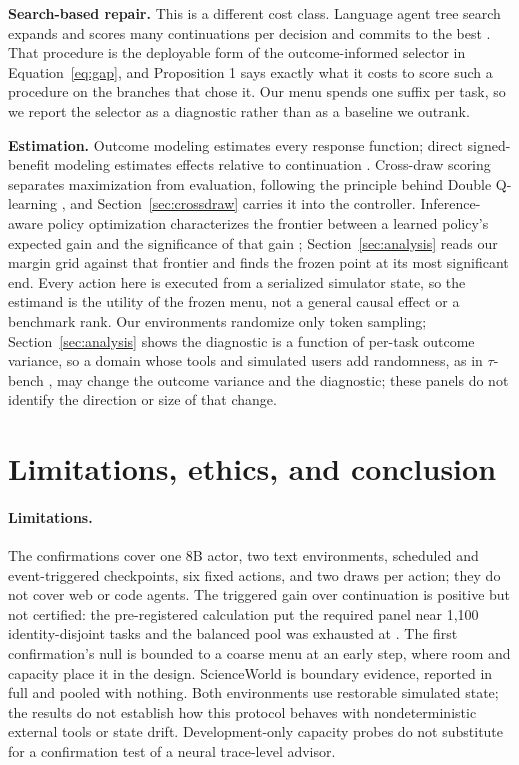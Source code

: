 \documentclass{article}
\begin{document}
\textbf{Search-based repair.} This is a different cost class. Language agent tree search expands and scores many continuations per decision and commits to the best \citep{zhou2024lats}. That procedure is the deployable form of the outcome-informed selector in Equation~\ref{eq:gap}, and Proposition 1 says exactly what it costs to score such a procedure on the branches that chose it. Our menu spends one suffix per task, so we report the selector as a diagnostic rather than as a baseline we outrank.

\textbf{Estimation.} Outcome modeling estimates every response function; direct signed-benefit modeling estimates effects relative to continuation \citep{kunzel2019metalearners}. Cross-draw scoring separates maximization from evaluation, following the principle behind Double Q-learning \citep{vanhasselt2010double}, and Section~\ref{sec:crossdraw} carries it into the controller. Inference-aware policy optimization characterizes the frontier between a learned policy's expected gain and the significance of that gain \citep{bastani2025inference}; Section~\ref{sec:analysis} reads our margin grid against that frontier and finds the frozen point at its most significant end. Every action here is executed from a serialized simulator state, so the estimand is the utility of the frozen menu, not a general causal effect or a benchmark rank. Our environments randomize only token sampling; Section~\ref{sec:analysis} shows the diagnostic is a function of per-task outcome variance, so a domain whose tools and simulated users add randomness, as in $\tau$-bench \citep{yao2024taubench}, may change the outcome variance and the diagnostic; these panels do not identify the direction or size of that change.

\section{Limitations, ethics, and conclusion}

\paragraph{Limitations.} The confirmations cover one 8B actor, two text environments, scheduled and event-triggered checkpoints, six fixed actions, and two draws per action; they do not cover web or code agents. The triggered gain over continuation is positive but not certified: the pre-registered calculation put the required panel near 1,100 identity-disjoint tasks and the balanced pool was exhausted at \EventPlanned{}. The first confirmation's null is bounded to a coarse menu at an early step, where room and capacity place it in the design. ScienceWorld is boundary evidence, reported in full and pooled with nothing. Both environments use restorable simulated state; the results do not establish how this protocol behaves with nondeterministic external tools or state drift. Development-only capacity probes do not substitute for a confirmation test of a neural trace-level advisor.
\end{document}
